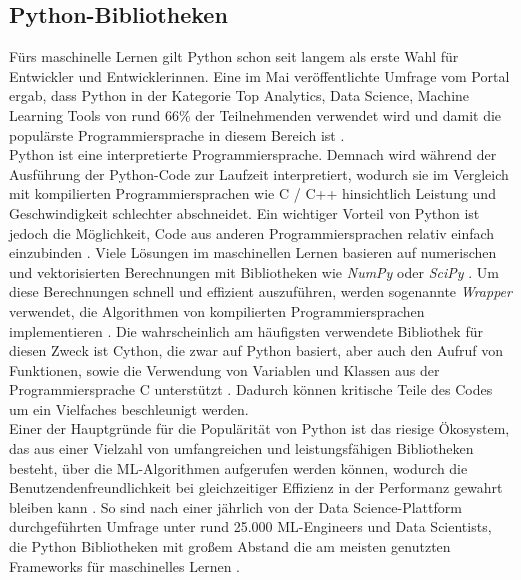 \documentclass[german,bachelor]{swsLeipzig}
\begin{document}

\subsection{Python-Bibliotheken}
Fürs maschinelle Lernen gilt Python schon seit langem als erste Wahl für Entwickler und Entwicklerinnen.
Eine im Mai \citeyear{nugget} veröffentlichte Umfrage vom Portal \citeauthor{nugget} ergab, dass Python in der Kategorie
\glqq Top Analytics, Data Science, Machine Learning Tools\grqq{} von rund 66\% der Teilnehmenden verwendet wird
und damit die populärste Programmiersprache in diesem Bereich ist \cite[]{nugget}. \\

Python ist eine interpretierte Programmiersprache.
Demnach wird während der Ausführung der Python-Code zur Laufzeit interpretiert, wodurch sie im Vergleich mit kompilierten
Programmiersprachen wie C / C++ hinsichtlich Leistung und Geschwindigkeit schlechter abschneidet.
Ein wichtiger Vorteil von Python ist jedoch die Möglichkeit, Code aus anderen Programmiersprachen relativ einfach einzubinden \cite[]{8757088}.
Viele Lösungen im maschinellen Lernen basieren auf numerischen und vektorisierten Berechnungen mit Bibliotheken
wie \textit{NumPy} oder \textit{SciPy} \cite[]{8757088}.
Um diese Berechnungen schnell und effizient auszuführen, werden sogenannte \textit{Wrapper} verwendet,
die Algorithmen von kompilierten Programmiersprachen implementieren \cite[]{8757088}.
Die wahrscheinlich am häufigsten verwendete Bibliothek für diesen Zweck ist Cython, die zwar auf Python basiert,
aber auch den Aufruf von Funktionen, sowie die Verwendung von Variablen und Klassen aus der Programmiersprache C unterstützt \cite[]{8757088}.
Dadurch können kritische Teile des Codes um ein Vielfaches beschleunigt werden. \\

Einer der Hauptgründe für die Populärität von Python ist das riesige Ökosystem, das aus einer Vielzahl
von umfangreichen und leistungsfähigen Bibliotheken besteht, über die ML-Algorithmen aufgerufen werden können,
wodurch die Benutzendenfreundlichkeit bei gleichzeitiger Effizienz in der Performanz gewahrt bleiben kann \cite[]{2020}.
So sind nach einer jährlich von der Data Science-Plattform \citeauthor{kaggle} durchgeführten Umfrage unter rund 25.000 ML-Engineers
und Data Scientists, die Python Bibliotheken mit großem Abstand die am meisten genutzten Frameworks für maschinelles Lernen \cite[]{kaggle}.\\
\end{document}
